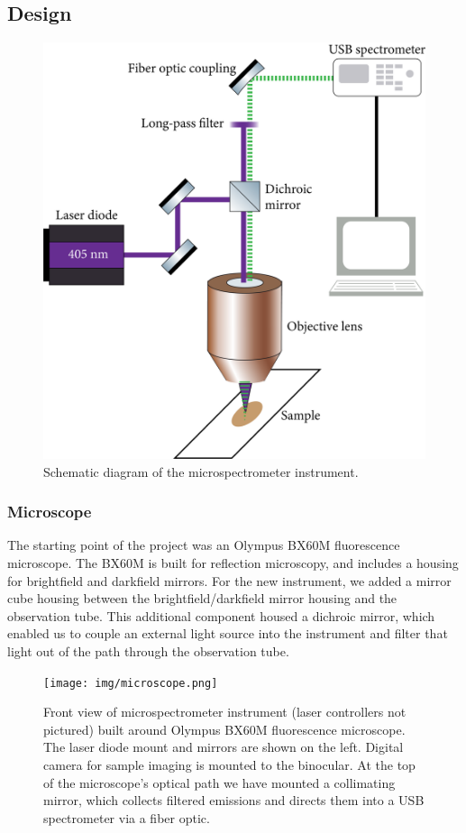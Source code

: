 \subsection{Design}

\begin{figure}[h]
    \centering
    \includegraphics[width=.75\textwidth]{img/optical-diagram.png}
    \caption{Schematic diagram of the microspectrometer instrument.}
    \label{img:optical-diagram}
\end{figure}

\subsubsection{Microscope}

The starting point of the project was an Olympus BX60M fluorescence microscope. The BX60M is built for reflection microscopy, and includes a housing for brightfield and darkfield mirrors. For the new instrument, we added a mirror cube housing between the brightfield/darkfield mirror housing and the observation tube. This additional component housed a dichroic mirror, which enabled us to couple an external light source into the instrument and filter that light out of the path through the observation tube.

\begin{figure}[H]
    \centering
    \texttt{[image: img/microscope.png]}
    \caption[Front view of microspectrometer instrument.]{Front view of microspectrometer instrument (laser controllers not pictured) built around Olympus BX60M fluorescence microscope. The laser diode mount and mirrors are shown on the left. Digital camera for sample imaging is mounted to the binocular. At the top of the microscope's optical path we have mounted a collimating mirror, which collects filtered emissions and directs them into a USB spectrometer via a fiber optic.}
    \label{img:microscope}
\end{figure}


